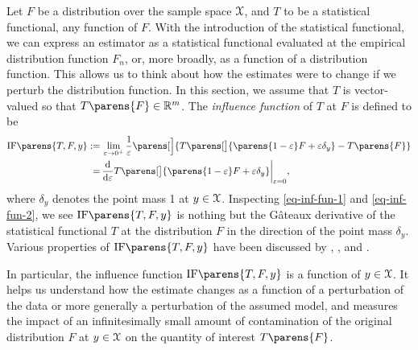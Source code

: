 Let $F$ be a distribution over the sample space $\mathcal{X}$, and $T$ to be a statistical functional, any function of $F$. With the introduction of the statistical functional, we can express an estimator as a statistical functional evaluated at the empirical distribution function $F_n$, or, more broadly, as a function of a distribution function. This allows us to think about how the estimates were to change if we perturb the distribution function. In this section, we assume that $T$ is vector-valued so that $T \parens{F} \in \Real^m$. The \textit{influence function} of $T$ at $F$ is defined to be 
\begin{align}
	\mathrm{IF} \parens{T, F, y} := & \, \lim_{\varepsilon \to 0^+} \frac{1}{\varepsilon} \parens[\Big]{T \parens[\big]{\parens{1 - \varepsilon} F + \varepsilon \delta_y} - T \parens{F}} \label{eq-inf-fun-1} \\
	= & \, \frac{\diff}{\diff \varepsilon} T \parens[\big]{\parens{1 - \varepsilon} F + \varepsilon \delta_y} \bigg\vert_{\varepsilon=0}, \label{eq-inf-fun-2}
\end{align}
where $\delta_y$ denotes the point mass 1 at $y \in \mathcal{X}$. Inspecting \eqref{eq-inf-fun-1} and \eqref{eq-inf-fun-2}, we see $\mathrm{IF} \parens{T, F, y}$ is nothing but the G{\^a}teaux derivative of the statistical functional $T$ at the distribution $F$ in the direction of the point mass $\delta_y$. Various properties of $\mathrm{IF} \parens{T, F, y}$ have been discussed by \textcite{Hampel1974-oe}, \textcite{Hampel1986-ig}, and \textcite{Wasserman2006-lj}. 

In particular, the influence function $\mathrm{IF} \parens{T, F, y}$ is a function of $y \in \mathcal{X}$. It helps us understand how the estimate changes as a function of a perturbation of the data or more generally a perturbation of the assumed model, and measures the impact of an infinitesimally small amount of contamination of the original distribution $F$ at $y \in \mathcal{X}$ on the quantity of interest $T \parens{F}$. 


